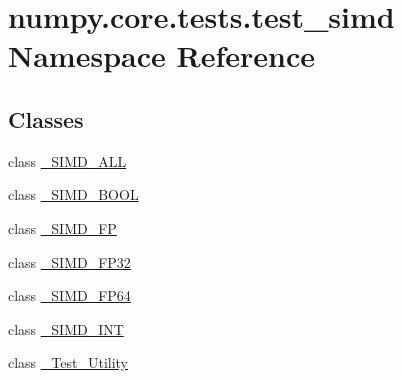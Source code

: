 \hypertarget{namespacenumpy_1_1core_1_1tests_1_1test__simd}{}\section{numpy.\+core.\+tests.\+test\+\_\+simd Namespace Reference}
\label{namespacenumpy_1_1core_1_1tests_1_1test__simd}
\subsection*{Classes}
\begin{DoxyCompactItemize}
\item 
class \hyperlink{classnumpy_1_1core_1_1tests_1_1test__simd_1_1__SIMD__ALL}{\+\_\+\+S\+I\+M\+D\+\_\+\+A\+LL}
\item 
class \hyperlink{classnumpy_1_1core_1_1tests_1_1test__simd_1_1__SIMD__BOOL}{\+\_\+\+S\+I\+M\+D\+\_\+\+B\+O\+OL}
\item 
class \hyperlink{classnumpy_1_1core_1_1tests_1_1test__simd_1_1__SIMD__FP}{\+\_\+\+S\+I\+M\+D\+\_\+\+FP}
\item 
class \hyperlink{classnumpy_1_1core_1_1tests_1_1test__simd_1_1__SIMD__FP32}{\+\_\+\+S\+I\+M\+D\+\_\+\+F\+P32}
\item 
class \hyperlink{classnumpy_1_1core_1_1tests_1_1test__simd_1_1__SIMD__FP64}{\+\_\+\+S\+I\+M\+D\+\_\+\+F\+P64}
\item 
class \hyperlink{classnumpy_1_1core_1_1tests_1_1test__simd_1_1__SIMD__INT}{\+\_\+\+S\+I\+M\+D\+\_\+\+I\+NT}
\item 
class \hyperlink{classnumpy_1_1core_1_1tests_1_1test__simd_1_1__Test__Utility}{\+\_\+\+Test\+\_\+\+Utility}
\end{DoxyCompactItemize}
